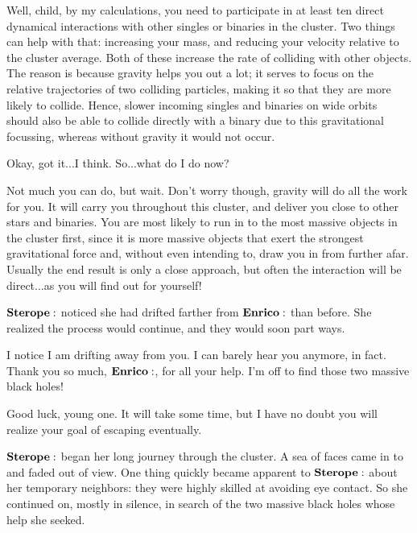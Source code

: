 \Enrico Well, child, by my calculations, you need to participate in at least ten direct dynamical interactions with other singles or binaries in the cluster.  Two things can help with that:  increasing your mass, and reducing your velocity relative to the cluster average.  Both of these increase the rate of colliding with other objects.  The reason is because gravity helps you out a lot; it serves to focus on the relative trajectories of two colliding particles, making it so that they are more likely to collide.  Hence, slower incoming singles and binaries on wide orbits should also be able to collide directly with a binary due to this gravitational focussing, whereas without gravity it would not occur.

\Sterope Okay, got it...I think.  So...what do I do now?

\Enrico Not much you can do, but wait.  Don't worry though, gravity will do all the work for you.  It will carry you throughout this cluster, and deliver you close to other stars and binaries.  You are most likely to run in to the most massive objects in the cluster first, since it is more massive objects that exert the strongest gravitational force and, without even intending to, draw you in from further afar.  Usually the end result is only a close approach, but often the interaction will be direct...as you will find out for yourself!

$\Sterope$ noticed she had drifted farther from $\Enrico$ than before.  She realized the process would continue, and they would soon part ways.

\Sterope I notice I am drifting away from you.  I can barely hear you anymore, in fact.  Thank you so much, $\Enrico$, for all your help.  I'm off to find those two massive black holes!

\Enrico Good luck, young one.  It will take some time, but I have no doubt you will realize your goal of escaping eventually.

$\Sterope$ began her long journey through the cluster.  A sea of faces came in to and faded out of view.  One thing quickly became apparent to $\Sterope$ about her temporary neighbors:  they were highly skilled at avoiding eye contact.  So she continued on, mostly in silence, in search of the two massive black holes whose help she seeked.




